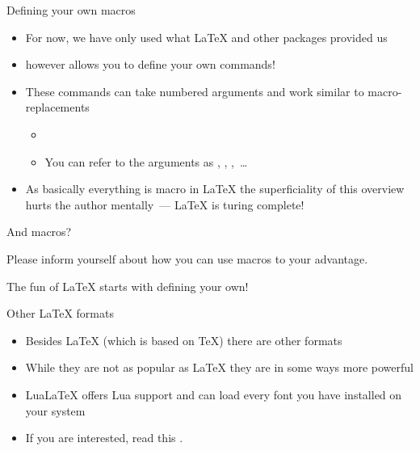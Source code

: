 \begin{frame}{Defining your own macros}
\begin{itemize}
   \itemsep4pt
   \item For now, we have only used what \LaTeX{} and other packages provided us
   \item \blatex{\\newcommand} however allows you to define your own commands!
   \item These commands can take numbered arguments and work similar to macro-replacements \begin{itemize}
      \item {}
      \item You can refer to the arguments as , , ,~\ldots
   \end{itemize}
   \item As basically everything is macro in \LaTeX{} the superficiality of this overview hurts the author mentally~--- \LaTeX{} is turing complete!
\end{itemize}
\end{frame}

\begin{frame}{And macros?}
   \begin{center}
      Please inform yourself about how you can use macros to your advantage.\smallskip

      The fun of \LaTeX{} starts with defining your own!
   \end{center}
\end{frame}

\begin{frame}{Other \LaTeX{} formats}
   \begin{itemize}
      \itemsep8pt
      \item Besides \LaTeX{} (which is based on \TeX) there are other formats
      \item While they are not as popular as \LaTeX{} they are in some ways more powerful
      \item Lua\LaTeX{} offers Lua support and can load every font you have installed on your system
      \item If you are interested, read this .
   \end{itemize}
\end{frame}

